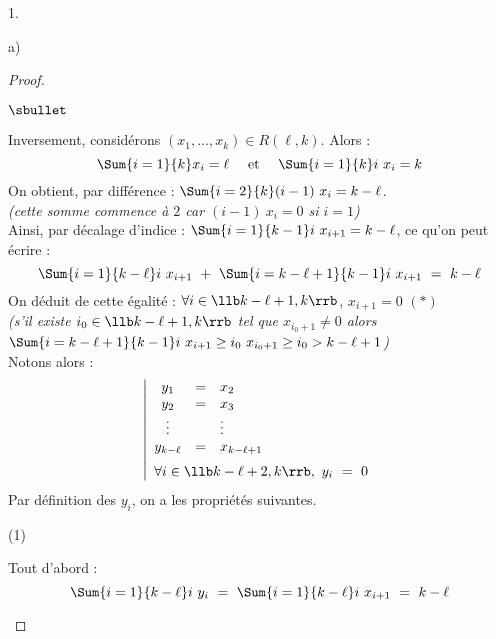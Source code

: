 \documentclass[11pt]{article}%
\begin{document}
\begin{noliste}{1.}
\begin{noliste}{a)}
\begin{proof}
\begin{noliste}{$\sbullet$}
      \item Inversement, considérons $(x_1, \ldots, x_k) \in R(\ell,
        k)$. Alors :
        \[
        \Sum{i = 1}{k} x_i = \ell \quad \text{ et } \quad \Sum{i=1}{k}
        i \ x_i = k
        \]
        On obtient, par différence : $\Sum{i=2}{k} (i-1) \ x_i = k -
        \ell$.\\
        {\it (cette somme commence à $2$ car $(i-1) \ x_i = 0$ si $i =
          1$)}\\
        Ainsi, par décalage d'indice : $\Sum{i=1}{k-1} i \ x_{i+1} = k
        - \ell$, ce qu'on peut écrire :
        \[
        \Sum{i=1}{k-\ell} i \ x_{i+1} \ + \ \Sum{i=k-\ell+1}{k-1} i \
        x_{i+1} \ = \ k - \ell
        \]
        On déduit de cette égalité : $\forall i \in \llb k-\ell+1,
        k\rrb$, $x_{i+1} = 0$ \qquad $(*)$\\
        {\it (s'il existe $i_0 \in \llb k-\ell+1, k\rrb$ tel que
          $x_{i_0+1} \neq 0$ alors $\Sum{i=k-\ell+1}{k-1} i \ x_{i+1}
          \geq i_0 \ x_{i_0 + 1} \geq i_0 > k-\ell+1$)}\\
        Notons alors :
        \[
        \left|
        \begin{array}{ccl}
          y_1 & = & x_2
          \\
          y_2 & = & x_3 
          \\
          \vdots & & \vdots
          \\
          y_{k - \ell} & = & x_{k - \ell + 1}
          \\[.2cm]
          \multicolumn{3}{l}{\forall i \in \llb k - \ell + 2, k \rrb,
          \ y_i \ = \ 0}
        \end{array}
        \right.
        \]
        Par définition des $y_i$, on a les propriétés suivantes.
        \begin{noliste}{(1)}
        \item Tout d'abord :
          \[
          \Sum{i = 1}{k - \ell} i \ y_i \ = \ \Sum{i = 1}{k - \ell} i
          \ x_{i+1} \ = \ k - \ell
          \]


\end{noliste}
\end{noliste}
\end{proof}
\end{noliste}
\end{noliste}
\end{document}
